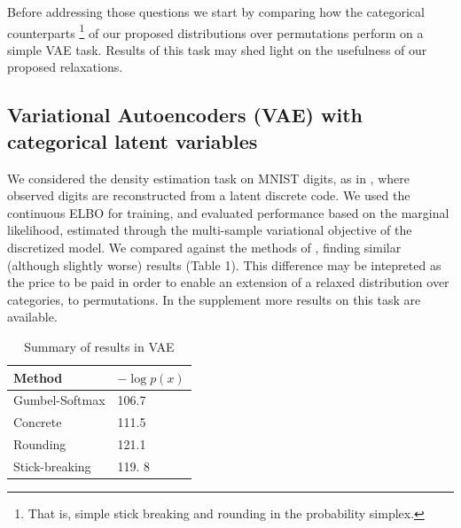 \documentclass[twoside]{article}
\begin{document}
Before addressing those questions we start by comparing how the categorical counterparts \footnote{That is, simple stick breaking and rounding in the probability simplex.} of our proposed distributions over permutations perform on a simple VAE task.  Results of this task may shed light on the usefulness of our proposed relaxations.

\subsection{Variational Autoencoders (VAE) with categorical latent variables}
We considered the density estimation
task on MNIST digits, as in \cite{maddison2016concrete,
  jang2016categorical}, where observed digits are reconstructed from a
latent discrete code. We used the continuous ELBO for training, and
evaluated performance based on the marginal likelihood, estimated
through the multi-sample variational objective of the discretized
model. We compared against the methods of
\cite{jang2016categorical, maddison2016concrete}, finding similar (although slightly worse) results (Table 1). This difference may be intepreted as the price to be paid in order to enable an extension of a relaxed distribution over categories, to permutations.  In the supplement more results on this task are available.
\begin{table}[t]
  \caption{Summary of results in VAE}
  \label{tab:vae}
  \centering
  \begin{tabular}{ll}
    \textbf{Method} & $- \log p(x)$ \\
    \hline
    Gumbel-Softmax    & 106.7 \\
    Concrete  &  111.5\\
    Rounding &  121.1 \\
    Stick-breaking & 119. 8\\
    \bottomrule
  \end{tabular}
\end{table}


   
\end{document}
